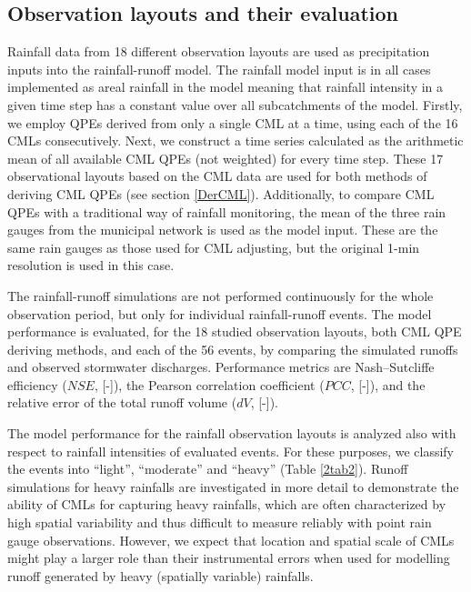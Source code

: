 \documentclass{ctuthesis}\usepackage[]{graphicx}\usepackage[]{color}
\begin{document}
\subsection{Observation layouts and their evaluation} \label{ObsLay}

Rainfall data from 18 different observation layouts are used as precipitation inputs into the rainfall-runoff model. The rainfall model input is in all cases implemented as areal rainfall in the model meaning that rainfall intensity in a given time step has a constant value over all subcatchments of the model. Firstly, we employ QPEs derived from only a single CML at a time, using each of the 16 CMLs consecutively. Next, we construct a time series calculated as the arithmetic mean of all available CML QPEs (not weighted) for every time step. These 17 observational layouts based on the CML data are used for both methods of deriving CML QPEs (see section \ref{DerCML}). Additionally, to compare CML QPEs with a traditional way of rainfall monitoring, the mean of the three rain gauges from the municipal network is used as the model input. These are the same rain gauges as those used for CML adjusting, but the original 1-min resolution is used in this case. 

The rainfall-runoff simulations are not performed continuously for the whole observation period, but only for individual rainfall-runoff events. The model performance is evaluated, for the 18 studied observation layouts, both CML QPE deriving methods, and each of the 56 events, by comparing the simulated runoffs and observed stormwater discharges. Performance metrics are Nash–Sutcliffe efficiency ($NSE$, [-]), the Pearson correlation coefficient ($PCC$, [-]), and the relative error of the total runoff volume ($dV$, [-]).

The model performance for the rainfall observation layouts is analyzed also with respect to rainfall intensities of evaluated events. For these purposes, we classify the events into “light”, “moderate” and “heavy” (Table \ref{2tab2}). Runoff simulations for heavy rainfalls are investigated in more detail to demonstrate the ability of CMLs for capturing heavy rainfalls, which are often characterized by high spatial variability and thus difficult to measure reliably with point rain gauge observations. However, we expect that location and spatial scale of CMLs might play a larger role than their instrumental errors when used for modelling runoff generated by heavy (spatially variable) rainfalls.
\end{document}

